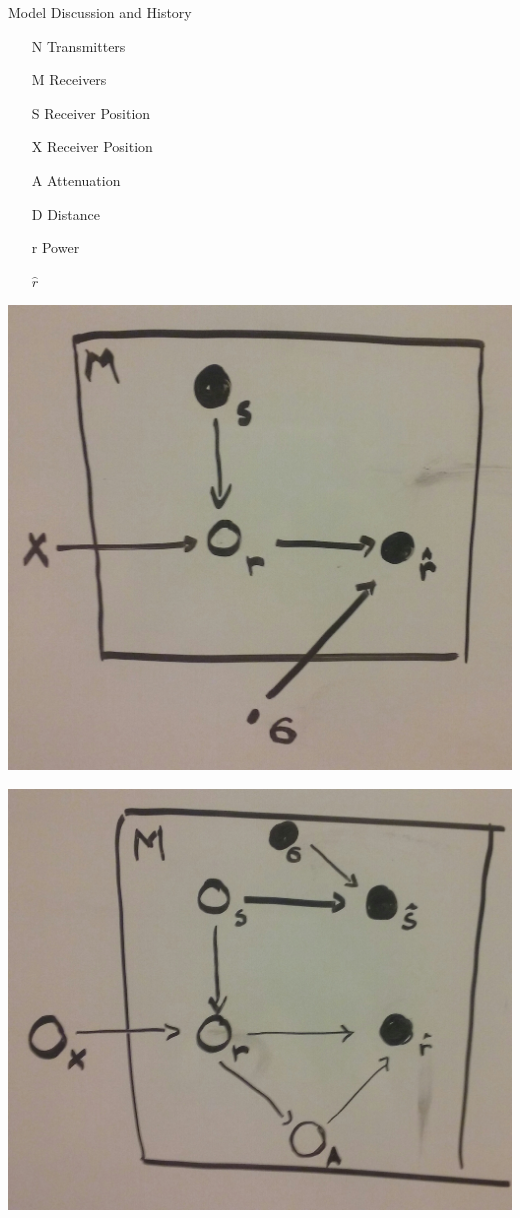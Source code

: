 \documentclass[11pt]{beamer}
\begin{document}
\begin{frame}{Model Discussion and History}
\begin{multicols}{3}
\begin{itemize}
\item[N] Transmitters
\item[M] Receivers
\item[S] Receiver Position
\item[X] Receiver Position
\item[A] Attenuation
\item[D] Distance
\item[r] Power
\item[$\hat{r}$]
\end{itemize}
\vfill
\columnbreak

\includegraphics[width=0.3\textheight]{pictures/1plate.jpg}

\includegraphics[width=0.3\textheight]{pictures/2plate.jpg}


\end{multicols}
\end{frame}
\end{document}
